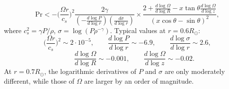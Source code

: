 \documentclass[12pt]{article}
\begin{document}
\begin{equation} \label{eqPr}
\text{Pr} < - \Big( \frac{\Omega r}{c_s} \Big)^2 \frac{2 \gamma}{ ( - \frac{d \log P}{d \log r}) (\frac{d \sigma}{d \log r})} \times \frac{2 + \frac{d \log \Omega}{d \log R} - x \tan{\theta} \frac{d \log \Omega}{d \log z}}{ (x \cos \theta - \sin \theta)^2}   , 
\end{equation}
where $c_s^2 = \gamma P/\rho$, $\sigma = \log (P \rho^{-\gamma})$. Typical values at $r = 0.6 R_\odot$:
\begin{equation}
\Big( \frac{\Omega r}{c_s} \Big)^2 \sim 2 \cdot 10^{-5}, \qquad \frac{d \log P}{d \log r} \sim -6.9, \qquad \frac{d \log \sigma}{d \log r} \sim 2.6,
\end{equation}
\begin{equation}
  \qquad \frac{d \log \Omega}{d \log R} \sim -0.001, \qquad \frac{d \log \Omega}{d \log z} \sim -0.02 .
\end{equation}
At $r = 0.7 R_\odot$, the logarithmic derivatives of $P$ and $\sigma$ are only moderately different, while those of $\Omega$ are larger by an order of magnitude.
\end{document}
